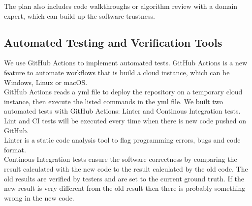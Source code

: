 \documentclass[12pt, titlepage]{article}
\begin{document}
\noindent The plan also includes code walkthroughs or algorithm review with a domain expert, which can build up the software trustness.  
%


\subsection{Automated Testing and Verification Tools}


We use GitHub Actions to implement automated tests. GitHub Actions is a new feature to automate workflows that is build a cloud instance, which can be Windows, Linux or macOS. \\

\noindent GitHub Actions reads a yml file to deploy the repository on a temporary cloud instance, then execute the listed commands in the yml file. We built two automated tests with GitHub Actions: Linter and Continous Integration tests. Lint and CI tests will be executed every time when there is new code pushed on GitHub.\\

\noindent Linter is a static code analysis tool to flag programming errors, bugs and code format. \\

\noindent Continous Integration tests ensure the software correctness by comparing the result calculated with the new code to the result calculated by the old code. The old results are verified by testers and are set to the current ground truth. If the new result is very different from the old result then there is probably something wrong in the new code.\\
\end{document}
